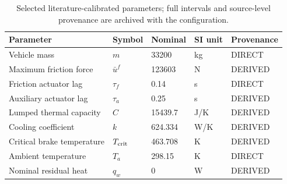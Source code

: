 \begin{table}[!t]
\centering\scriptsize
\caption{Selected literature-calibrated parameters; full intervals and source-level provenance are archived with the configuration.}
\label{tab:final-parameters}
\begin{tabular}{lllll}
\toprule
Parameter & Symbol & Nominal & SI unit & Provenance \\
\midrule
Vehicle mass & $m$ & 33200 & kg & DIRECT \\
Maximum friction force & $\bar u^f$ & 123603 & N & DERIVED \\
Friction actuator lag & $\tau_f$ & 0.14 & s & DIRECT \\
Auxiliary actuator lag & $\tau_a$ & 0.25 & s & DERIVED \\
Lumped thermal capacity & $C$ & 15439.7 & J/K & DERIVED \\
Cooling coefficient & $k$ & 624.334 & W/K & DERIVED \\
Critical brake temperature & $T_{\rm crit}$ & 463.708 & K & DERIVED \\
Ambient temperature & $T_a$ & 298.15 & K & DIRECT \\
Nominal residual heat & $q_w$ & 0 & W & DERIVED \\
\bottomrule
\end{tabular}
\end{table}
